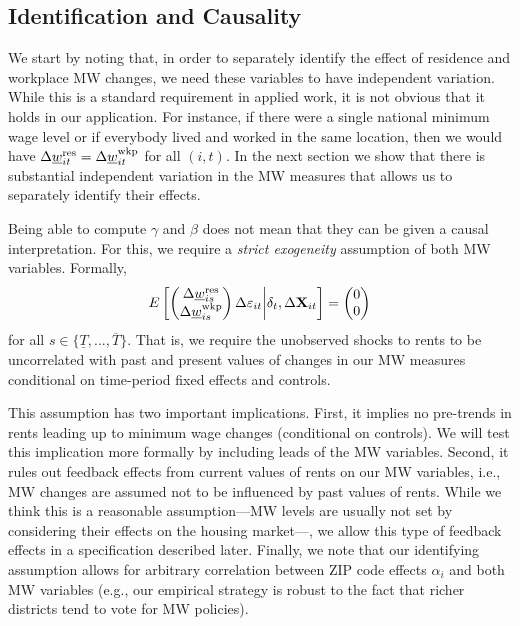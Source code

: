 \subsection{Identification and Causality}

We start by noting that, in order to separately identify the effect of 
residence and workplace MW changes, we need these variables to have independent
variation.
While this is a standard requirement in applied work, it is not obvious that it 
holds in our application.
For instance, if there were a single national minimum wage level or if everybody 
lived and worked in the same location, then we would have
$\Delta \underline{w}^{\text{res}}_{it} = \Delta \underline{w}^{\text{wkp}}_{it}$ for all $(i,t)$.
In the next section we show that there is substantial independent variation
in the MW measures that allows us to separately identify their effects.

Being able to compute $\gamma$ and $\beta$ does not mean that they can be given
a causal interpretation.
For this, we require a \textit{strict exogeneity} assumption of both MW 
variables. 
Formally,
\begin{equation}\label{eq:strict_exogeneity}
    E\left[
        \begin{pmatrix}
            \Delta \underline{w}^{\text{res}}_{is} \\
            \Delta \underline{w}^{\text{wkp}}_{is} \\
        \end{pmatrix}
        \Delta \varepsilon_{it}
    \bigg| \delta_t, \Delta \mathbf{X}_{it} \right] =
    \begin{pmatrix}
        0 \\
        0 \\
    \end{pmatrix}
\end{equation}
for all $s\in\{\underline{T}, ..., \overline{T}\}$.
That is, we require the unobserved shocks to rents to be uncorrelated with 
past and present values of changes in our MW measures 
conditional on time-period fixed effects and controls.

This assumption has two important implications.
First,
it implies no pre-trends in rents leading up to minimum wage changes 
(conditional on controls). We will test this implication more formally by 
including leads of the MW variables.
Second,
it rules out feedback effects from current values of rents on our MW variables, 
i.e., MW changes are assumed not to be influenced by past values of rents.
While we think this is a reasonable assumption---MW levels are usually not 
set by considering their effects on the housing market---, we allow this type of 
feedback effects in a specification described later.
Finally, we note that our identifying assumption allows for arbitrary 
correlation between ZIP code effects $\alpha_i$ and both MW variables
(e.g., our empirical strategy is robust to the fact that richer districts tend 
to vote for MW policies).

